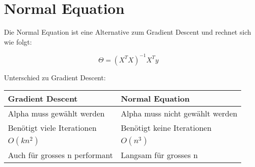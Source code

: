 \newpage
\section{Normal Equation}
\begin{flushleft}

Die Normal Equation ist eine Alternative zum Gradient Descent und rechnet sich wie folgt:

$$ \Theta = (X^{T}X)^{-1}X^{T}y $$

Unterschied zu Gradient Descent:
\begin{table}[h]
	\begin{tabular}{|l|l|}
		\hline
		{\textbf{Gradient Descent}} 		& {\textbf{Normal Equation}} 		\\ \hline
		Alpha muss gewählt werden       & Alpha muss nicht gewählt werden   \\ \hline
		Benötigt viele Iterationen      & Benötigt keine Iterationen        \\ \hline
		$O(kn^{2})$                     & $O(n^{3})$                        \\ \hline
		Auch für grosses n performant   & Langsam für grosses n             \\ \hline
	\end{tabular}
\end{table}
\end{flushleft}
